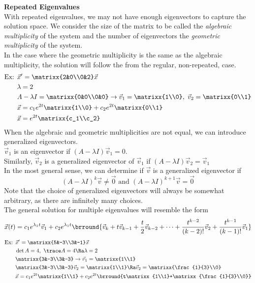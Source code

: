 \textbf{Repeated Eigenvalues}\\
With repeated eigenvalues, we may not have enough eigenvectors to capture the solution space. We consider the size of the matrix to be called the \textit{algebraic multiplicity} of the system and the number of eigenvectors the \textit{geometric multiplicity} of the system.\\
In the case where the geometric multiplicity is the same as the algebraic multiplicity, the solution will follow the from the regular, non-repeated, case.
\begin{align*}
    \text{Ex: }&\vec{x}'=\matrixx{2&0\\0&2}\vec{x}\\
    &\lambda=2\\
    &A-\lambda I=\matrixx{0&0\\0&0}\to\vec{v}_1=\matrixx{1\\0},\ \vec{v}_2=\matrixx{0\\1}\\
    &\vec{x}=c_1e^{2t}\matrixx{1\\0}+c_2e^{2t}\matrixx{0\\1}\\
    &\vec{x}=e^{2t}\matrixx{c_1\\c_2}
\end{align*}
When the algebraic and geometric multiplicities are not equal, we can introduce generalized eigenvectors.\\
$\vec{v}_1$ is an eigenvector if $(A-\lambda I)\vec{v}_1=0$.\\
Similarly, $\vec{v}_2$ is a generalized eigenvector of $\vec{v}_1$ if $(A-\lambda I)\vec{v}_2=\vec{v}_1$\\
In the most general sense, we can determine if $\vec{v}$ is a generalized eigenvector if
$$(A-\lambda I)^k\vec{v}\neq\vec{0}\text{ and }(A-\lambda I)^{k+1}\vec{v}=\vec{0}$$
Note that the choice of generalized eigenvectors will always be somewhat arbitrary, as there are infinitely many choices.\\
The general solution for multiple eigenvalues will resemble the form
$$\vec{x}(t)=c_1e^{\lambda_1 t}\vec{v}_1+c_2e^{\lambda_1 t}\brround{\vec{v}_k+t\vec{v}_{k-1}+\frac{t}{2}\vec{v}_{k-2}+\cdots+\frac{t^{k-2}}{(k-2)!}\vec{v}_2+\frac{t^{k-1}}{(k-1)!}\vec{v}_1}$$
\begin{align*}
    \text{Ex: }&\vec{x}'=\matrixx{5&-3\\3&-1}\vec{x}\\
    &\det A=4,\ \trace A=4\Ra \lambda=2\\
    &\matrixx{3&-3\\3&-3}\to\vec{v}_1=\matrixx{1\\1}\\
    &\matrixx{3&-3\\3&-3}\vec{v}_2=\matrixx{1\\1}\Ra\vec{v}_2=\matrixx{\frac{1}{3}\\0}\\
    &\vec{x}=c_1e^{2t}\matrixx{1\\1}+c_2e^{2t}\brround{t\matrixx{1\\1}+\matrixx{\frac{1}{3}\\0}}
\end{align*}
